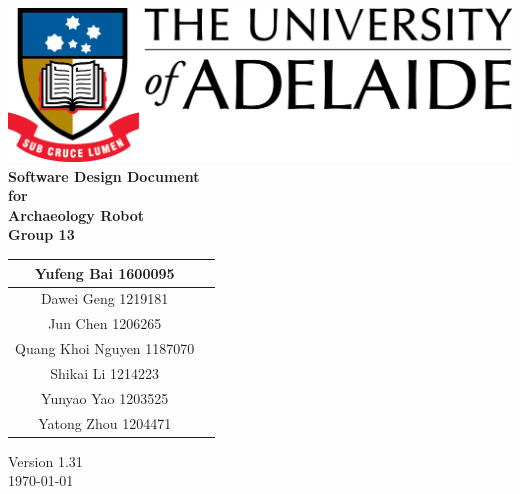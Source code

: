 \begin{center}
\includegraphics[scale=1.5]{./UniLogo}\\[1cm]    
\textbf{\Huge \bfseries Software Design Document}\\[1.5cm]
\textbf{\huge for}\\[0.5cm]


\textbf{ \huge Archaeology Robot }\\[0.3cm]
\textbf{ \huge Group 13 }\\[2cm]


\begin{tabular}{ |c | p{2cm} |}
	\hline
Yufeng Bai 1600095 & \\[.5cm] \hline
Dawei Geng 1219181 & \\[.5cm] \hline
Jun Chen 1206265 & \\[.5cm] \hline
Quang Khoi Nguyen 1187070  & \\[.5cm] \hline
Shikai Li 1214223 & \\[.5cm] \hline
Yunyao Yao 1203525 & \\[.5cm] \hline
Yatong Zhou 1204471 & \\[.5cm] \hline
\end{tabular}


\vfill

Version 1.31 \\ [0.2cm]
{\large \today}

\end{center}